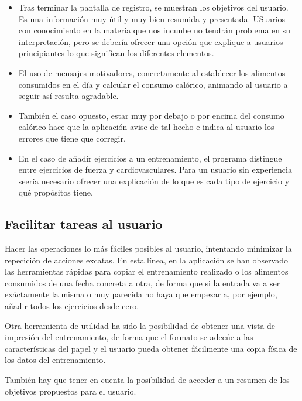 \documentclass[a4paper]{article}
\begin{document}
		\begin{itemize}
		\item	Tras terminar la pantalla de registro, se muestran los objetivos del usuario. Es una información muy útil y muy bien resumida y presentada. USuarios con conocimiento en la materia que nos incunbe no tendrán problema en su interpretación, pero se debería ofrecer una opción que explique a usuarios principiantes lo que significan los diferentes elementos.
		
		\item	El uso de mensajes motivadores, concretamente al establecer los alimentos consumidos en el día y calcular el consumo calórico, animando al usuario a seguir así resulta agradable.
		
		\item	También el caso opuesto, estar muy por debajo o por encima del consumo calórico hace que la aplicación avise de tal hecho e indica al usuario los errores que tiene que corregir.
		
		\item	En el caso de añadir ejercicios a un entrenamiento, el programa distingue entre ejercicios de fuerza y cardiovasculares. Para un usuario sin experiencia seería necesario ofrecer una explicación de lo que es cada tipo de ejercicio y qué propósitos tiene.
		\end{itemize}
	
	\subsection{Facilitar tareas al usuario}
	
	Hacer las operaciones lo más fáciles posibles al usuario, intentando minimizar la repecición de acciones excatas. En esta línea, en la aplicación se han observado las herramientas rápidas para copiar el entrenamiento realizado o los alimentos consumidos de una fecha concreta a otra, de forma que si la entrada va a ser exáctamente la misma o muy parecida no haya que empezar a, por ejemplo, añadir todos los ejercicios desde cero.
	
	Otra herramienta de utilidad ha sido la posibilidad de obtener una vista de impresión del entrenamiento, de forma que el formato se adecúe a las características del papel y el usuario pueda obtener fácilmente una copia física de los datos del entrenamiento.
	
	También hay que tener en cuenta la posibilidad de acceder a un resumen de los objetivos propuestos para el usuario.
	
\end{document}

